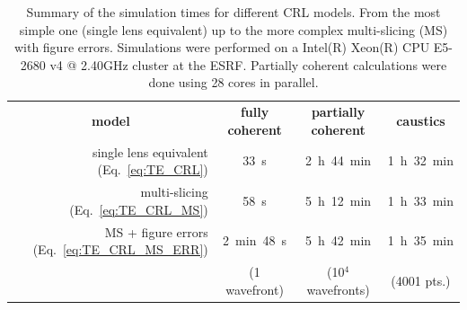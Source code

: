 \begin{refsection}
\begin{table}[h]
\caption[Summary of the simulation times for different CRL models]{Summary of the simulation times for different CRL models. From the most simple one (single lens equivalent) up to the more complex multi-slicing (MS) with figure errors. Simulations were performed on a Intel(R) Xeon(R) CPU E5-2680 v4 @ 2.40GHz cluster at the ESRF. Partially coherent calculations were done using 28 cores in parallel.}\label{tab:simulation_time}\small
\centering
\begin{tabular}{rccc}\hline\hline
\multicolumn{1}{c}{\textbf{model}} & \textbf{fully coherent} &\textbf{ partially coherent} & \textbf{caustics}\\\cline{1-4}
single lens equivalent (Eq.~\ref{eq:TE_CRL})                 &33~s            &2~h~44~min  &1~h~32~min               \\
multi-slicing  (Eq.~\ref{eq:TE_CRL_MS})                     &58~s            &5~h~12~min  &1~h~33~min               \\
MS + figure errors  (Eq.~\ref{eq:TE_CRL_MS_ERR})                &2~min~48~s      &5~h~42~min  &1~h~35~min               \\\cline{2-4}
\multicolumn{1}{c}{}               & (1 wavefront)  & (10$^{4}$ wavefronts)  & (4001 pts.) \\\hline\hline
\end{tabular}
\end{table}











\printbibliography[heading=subbibliography]
\end{refsection}

